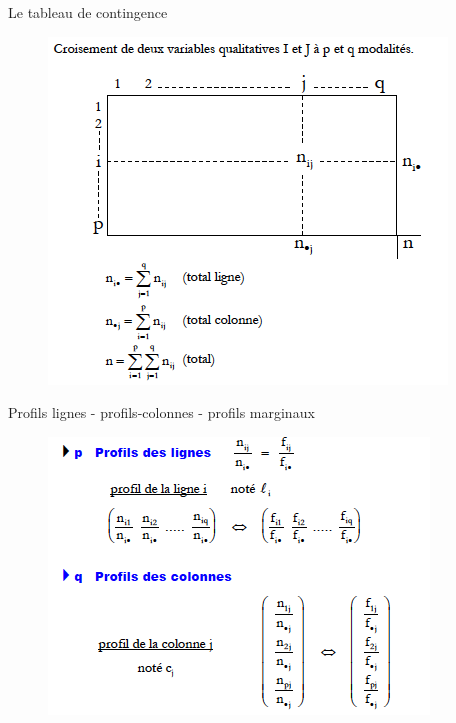 \documentclass[10pt]{beamer}
\begin{document}




\begin{frame}{Le tableau de contingence}
\begin{figure}
\includegraphics[scale=0.6]{Exemple3.png}  
\end{figure}
\end{frame}

 

 
\begin{frame}{Profils lignes - profils-colonnes - profils
marginaux}
\begin{figure}
\includegraphics[scale=0.7]{exemple9.png}  
\end{figure}
\end{frame}
\end{document}
